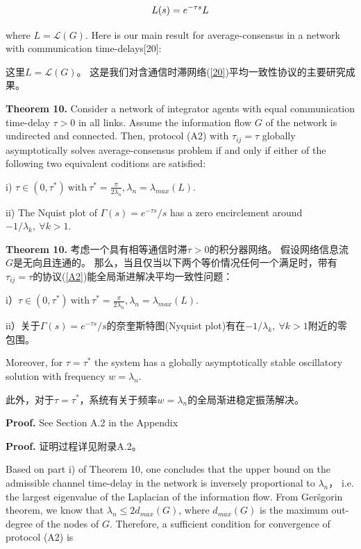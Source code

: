 \documentclass{article}
\begin{document}
\begin{equation}
    L(s) = e^{-\tau s}L
    \notag
\end{equation}

{\color[gray]{0.5}
\noindent where $L=\mathcal{L}(G)$. 
Here is our main result for average-consensus in a network with communication time-delays[20]: 
}

\noindent 这里$L=\mathcal{L}(G)$。
这是我们对含通信时滞网络(\ref{20})平均一致性协议的主要研究成果。

{\color[gray]{0.5}
\noindent \textbf{Theorem 10.} Consider a network of integrator agents with equal communication time-delay $\tau>0$ in all links.
Assume the information flow $G$ of the network is undirected and connected. 
Then, protocol (A2) with $\tau_{ij}=\tau$ globally asymptotically solves average-consensus problem if and only if either of the following two equivalent coditions are satisfied: 

i) $\tau \in (0, \tau^*)\ \text{with}\ \tau^*=\frac{\pi}{2\lambda_n}, \lambda_n=\lambda_{max}(L)$.

ii) The Nquist plot of $\Gamma(s) = e^{-\tau s}/s$ has a zero encirclement around $-1/\lambda_k,\ \forall k > 1$. 
}

\noindent \textbf{Theorem 10.} 考虑一个具有相等通信时滞$\tau > 0$的积分器网络。
假设网络信息流$G$是无向且连通的。
那么，当且仅当以下两个等价情况任何一个满足时，带有$\tau_{ij} = \tau$的协议(\ref{A2})能全局渐进解决平均一致性问题：

i）$\tau \in (0, \tau^*)\ \text{with}\ \tau^*=\frac{\pi}{2\lambda_n}, \lambda_n=\lambda_{max}(L)$.

ii）关于$\Gamma(s) = e^{-\tau s}/s$的奈奎斯特图(Nyquist plot)有在$-1/\lambda_k,\ \forall k > 1$附近的零包围。

{\color[gray]{0.5}
\noindent Moreover, for $\tau=\tau^*$ the system has a globally asymptotically stable oscillatory solution with frequency $w=\lambda_n$. 
}

\noindent 此外，对于$\tau=\tau^*$，系统有关于频率$w=\lambda_n$的全局渐进稳定振荡解决。

{\color[gray]{0.5}
\noindent \textbf{Proof.} See Section A.2 in the Appendix
}

\noindent \textbf{Proof.} 证明过程详见附录A.2。

{\color[gray]{0.5}
Based on part i) of Theorem 10, one concludes that the upper bound on the admissible channel time-delay in the network is inversely proportional to $\lambda_n$， i.e. the largest eigenvalue of the Laplacian of the information flow. 
From Ger\v sgorin theorem, we know that $\lambda_n\le 2d_{max}(G)$, where $d_{max}(G)$ is the maximum out-degree of the nodes of $G$. 
Therefore, a sufficient condition for convergence of protocol (A2) is 
}
\end{document}
